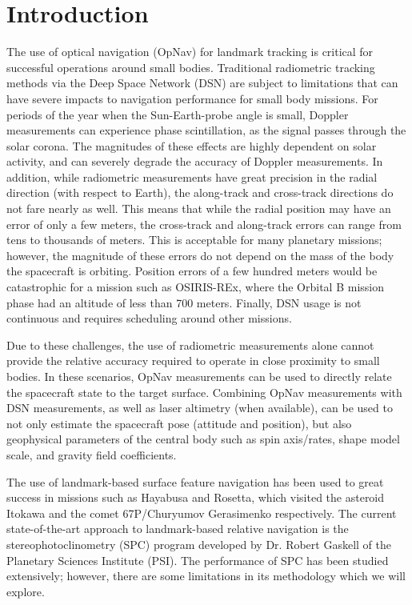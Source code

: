 \documentclass{src/RPI-SIW}
\begin{document}
\section*{Introduction}
The use of optical navigation (OpNav) for landmark tracking is critical for successful operations around small bodies.  Traditional radiometric tracking methods via the Deep Space Network (DSN) are subject to limitations that can have severe impacts to navigation performance for small body missions.  For periods of the year when the Sun-Earth-probe angle is small, Doppler measurements can experience phase scintillation, as the signal passes through the solar corona.  The magnitudes of these effects are highly dependent on solar activity, and can severely degrade the accuracy of Doppler measurements.\cite{dsn_handbook}  In addition, while radiometric measurements have great precision in the radial direction (with respect to Earth), the along-track and cross-track directions do not fare nearly as well. This means that while the radial position may have an error of only a few meters, the cross-track and along-track errors can range from tens to thousands of meters.   This is acceptable for many planetary missions; however, the magnitude of these errors do not depend on the mass of the body the spacecraft is orbiting.\cite{opnav_near_sb}  Position errors of a few hundred meters would be catastrophic for a mission such as OSIRIS-REx, where the Orbital B mission phase had an altitude of less than 700 meters.  Finally, DSN usage is not continuous and requires scheduling around other missions.

Due to these challenges, the use of radiometric measurements alone cannot provide the relative accuracy required to operate in close proximity to small bodies.  In these scenarios, OpNav measurements can be used to directly relate the spacecraft state to the target surface.  Combining OpNav measurements with DSN measurements, as well as laser altimetry (when available), can be used to not only estimate the spacecraft pose (attitude and position), but also geophysical parameters of the central body such as spin axis/rates, shape model scale, and gravity field coefficients.

The use of landmark-based surface feature navigation has been used to great success in missions such as Hayabusa\cite{hayabusa} and Rosetta\cite{rosetta}, which visited the asteroid Itokawa and the comet  67P/Churyumov Gerasimenko respectively.  The current state-of-the-art approach to landmark-based relative navigation is the stereophotoclinometry (SPC) program developed by Dr. Robert Gaskell of the Planetary Sciences Institute (PSI).  The performance of SPC has been studied extensively;\cite{spc_sensitiviy} however, there are some limitations in its methodology which we will explore.
\end{document}
